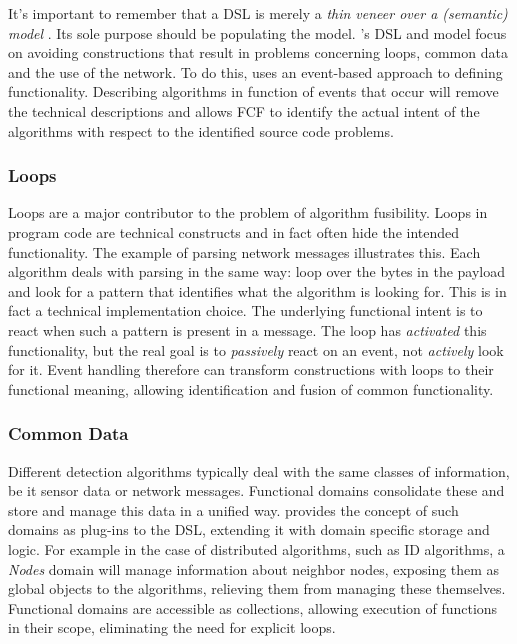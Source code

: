 \documentclass[3p,times,procedia]{elsarticle}
\begin{document}
It's important to remember that a DSL is merely a \emph{thin veneer over a
(semantic) model} \cite{fowler2010domain}. Its sole purpose should be
populating the model. \FOO's DSL and model focus on avoiding constructions that
result in problems concerning loops, common data and the use of the network. To
do this, \FOO uses an event-based approach to defining functionality.
Describing algorithms in function of events that occur will remove the
technical descriptions and allows FCF to identify the actual intent of the
algorithms with respect to the identified source code problems.

\vspace{-1mm}
\subsubsection{Loops}

Loops are a major contributor to the problem of algorithm fusibility. Loops in
program code are technical constructs and in fact often hide the intended
functionality. The example of parsing network messages illustrates this. Each
algorithm deals with parsing in the same way: loop over the bytes in the
payload and look for a pattern that identifies what the algorithm is looking
for. This is in fact a technical implementation choice. The underlying
functional intent is to react when such a pattern is present in a message. The
loop has \emph{activated} this functionality, but the real goal is to
\emph{passively} react on an event, not \emph{actively} look for it. Event
handling therefore can transform constructions with loops to their functional
meaning, allowing identification and fusion of common functionality.

\vspace{-1mm}
\subsubsection{Common Data}

Different detection algorithms typically deal with the same classes of
information, be it sensor data or network messages. Functional domains
consolidate these and store and manage this data in a unified way. \FOO
provides the concept of such domains as plug-ins to the DSL, extending it with
domain specific storage and logic. For example in the case of distributed
algorithms, such as ID algorithms, a \emph{Nodes} domain will manage
information about neighbor nodes, exposing them as global objects to the
algorithms, relieving them from managing these themselves. Functional domains
are accessible as collections, allowing execution of functions in their scope,
eliminating the need for explicit loops.
\end{document}
